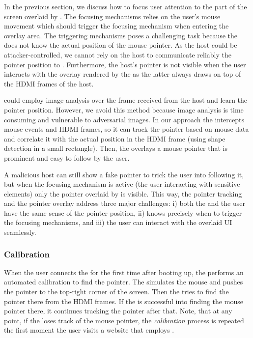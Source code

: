 In the previous section, we discuss how to focus user attention to the part of the screen overlaid by \device. The focusing mechanisms relies on the user's mouse movement which should trigger the focusing mechanism when entering the overlay area. The triggering mechanisms poses a challenging task because the \device does not know the actual position of the mouse pointer. As the host could be attacker-controlled, we cannot rely on the host to communicate reliably the pointer position to \device. Furthermore, the host's pointer is not visible when the user interacts with the overlay rendered by the \device as the latter always draws on top of the HDMI frames of the host. 

\device could employ image analysis over the frame received from the host and learn the pointer position. However, we avoid this method because image analysis is time consuming and vulnerable to adversarial images. In our approach the \device intercepts mouse events and HDMI frames, so it can track the pointer based on mouse data and correlate it with the actual position in the HDMI frame (using shape detection in a small rectangle). Then, the \device overlays a mouse pointer that is prominent and easy to follow by the user. 

A malicious host can still show a fake pointer to trick the user into following it, but when the focusing mechanism is active (the user interacting with sensitive elements) only the pointer overlaid by \device is visible. This way, the pointer tracking and the pointer overlay address three major challenges: i) both the \device and the user have the same sense of the pointer position, ii) \device knows precisely when to trigger the focusing mechanisms, and iii) the user can interact with the overlaid UI seamlessly. 


\subsubsection{\bfseries Calibration}\label{sec:systemDesign:analysis:calibration} When the user connects the \device for the first time after booting up, the \device performs an automated calibration to find the pointer. The \device simulates the mouse and pushes the pointer to the top-right corner of the screen. Then the \device tries to find the pointer there from the HDMI frames. If the \device is successful into finding the mouse pointer there, it continues tracking the pointer after that. Note, that at any point, if the \device loses track of the mouse pointer, the \emph{calibration} process is repeated the first moment the user visits a website that employs \name.


